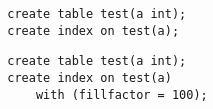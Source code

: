 \documentclass[usenames,dvipsnames, 18pt, compress, aspectratio=169]{beamer}
\begin{document}
\begin{frame}[fragile]{}
    \frametitle{}

    \begin{overprint}[\textwidth]
        \begin{verbatim}
        create table test(a int);
        create index on test(a);
        \end{verbatim}

        \begin{verbatim}
        create table test(a int);
        create index on test(a)
            with (fillfactor = 100);
        \end{verbatim}
    \end{overprint}

\end{frame}
\end{document}
